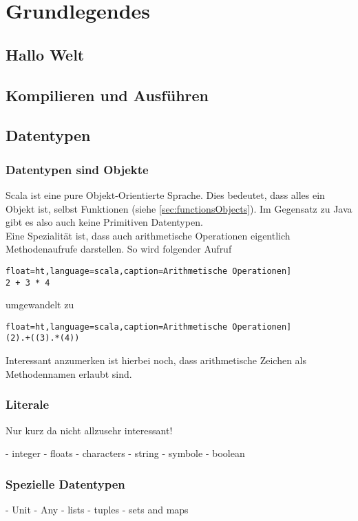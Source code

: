 \chapter{Grundlegendes}

\section{Hallo Welt}

\section{Kompilieren und Ausführen}

\section{Datentypen}
\label{sec:datatypes}

\subsection{Datentypen sind Objekte}

Scala ist eine pure Objekt-Orientierte Sprache. Dies bedeutet, dass alles
ein Objekt ist, selbst Funktionen (siehe \ref{sec:functionsObjects}). Im
Gegensatz zu Java gibt es also auch keine Primitiven Datentypen.\\

Eine Spezialität ist, dass auch arithmetische Operationen eigentlich
Methodenaufrufe darstellen. So wird folgender Aufruf

\begin{lstlisting}float=ht,language=scala,caption=Arithmetische Operationen]
2 + 3 * 4
\end{lstlisting}

umgewandelt zu
\begin{lstlisting}float=ht,language=scala,caption=Arithmetische Operationen]
(2).+((3).*(4))
\end{lstlisting}

Interessant anzumerken ist hierbei noch, dass arithmetische Zeichen
als Methodennamen erlaubt sind.

\subsection{Literale}
Nur kurz da nicht allzusehr interessant!

- integer
- floats
- characters
- string
- symbole
- boolean


\subsection{Spezielle Datentypen}

- Unit
- Any
- lists
- tuples
- sets and maps
